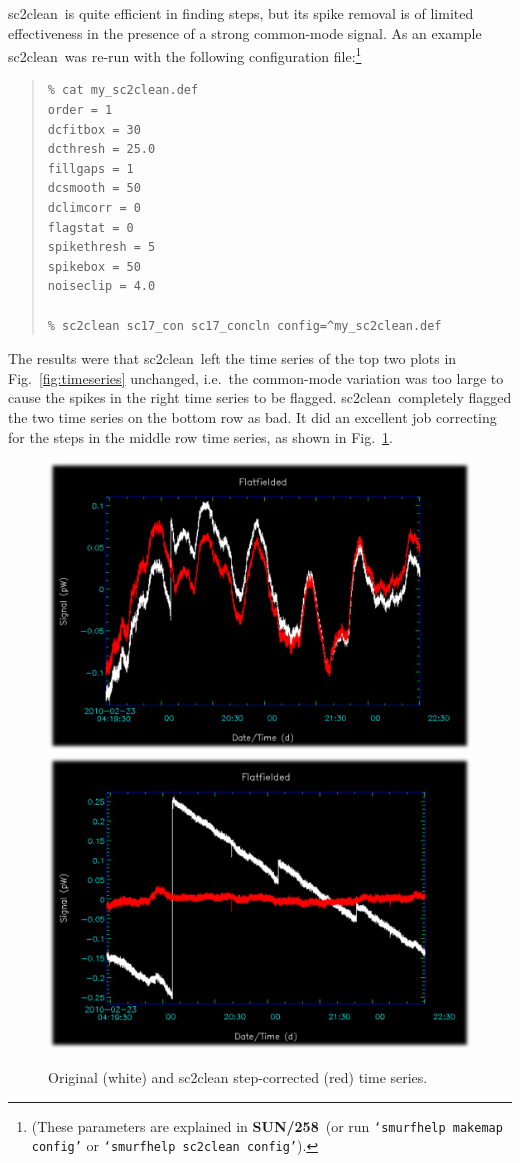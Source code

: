 \documentclass[twoside,11pt]{article}
\newcommand{\xref}[3]{#1}
\renewcommand{\_}{\texttt{\symbol{95}}}
\newenvironment{myquote}{\begin{quote}\begin{small}}{\end{small}\end{quote}}
\newcommand{\task}[1]{\textsf{#1}}
\newcommand{\clean}{\xref{\task{sc2clean}}{sun258}{SC2CLEAN}}
\newcommand{\smurfsun}{\xref{\textbf{SUN/258}}{sun258}{}}
\begin{document}
\clean\ is quite efficient in finding steps, but its spike removal is
of limited effectiveness in the presence of a strong common-mode
signal.  As an example \clean\ was re-run with the following
configuration file:\footnote{(These parameters are explained in
  \smurfsun\ (or run \texttt{`smurfhelp makemap config'} or
  \texttt{`smurfhelp sc2clean config'}).}

\begin{myquote}
\begin{verbatim}
% cat my_sc2clean.def
order = 1
dcfitbox = 30
dcthresh = 25.0
fillgaps = 1
dcsmooth = 50
dclimcorr = 0
flagstat = 0
spikethresh = 5
spikebox = 50
noiseclip = 4.0

% sc2clean sc17_con sc17_concln config=^my_sc2clean.def
\end{verbatim}
\end{myquote}

The results were that \clean\ left the time series of the top two
plots in Fig.~\ref{fig:timeseries} unchanged, i.e.\ the common-mode
variation was too large to cause the spikes in the right time series
to be flagged. \clean\ completely flagged the two time series on the
bottom row as bad. It did an excellent job correcting for the steps in
the middle row time series, as shown in Fig.\ \ref{fig:stepcorrectcf}.

\begin{figure}[ht]
\begin{center}
\includegraphics[width=0.45\linewidth]{sc19_sc2clean_13_31}
\hspace{0.03\linewidth}
\includegraphics[width=0.45\linewidth]{sc19_sc2clean_16_33}
\caption{Original (white) and sc2clean step-corrected (red) time series.}
\label{fig:stepcorrectcf}
\end{center}
\end{figure}
\end{document}
